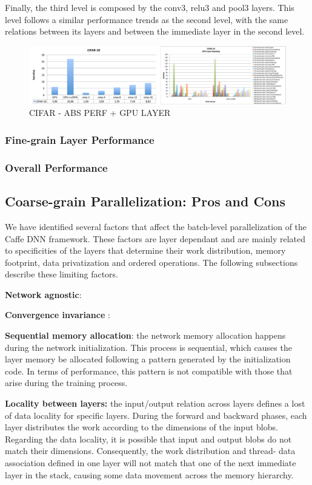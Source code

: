Finally, the third level is composed by the conv3, relu3 and pool3 
layers. This level follows a similar performance trends as the second 
level, with the same relations between its layers and between the 
immediate layer in the second level.

\begin{figure}[]
\includegraphics[width=\textwidth]{figures/cifar-abs-perf+gpu-layer.pdf}
\caption{CIFAR - ABS PERF + GPU LAYER }
\end{figure}
\subsubsection{Fine-grain Layer Performance}

\subsubsection{Overall Performance}

\subsection{Coarse-grain Parallelization: Pros and Cons}
We have identified several factors that affect the batch-level
parallelization of the Caffe DNN framework. These factors are
layer dependant and are mainly related to specificities of the
layers that determine their work distribution, memory footprint,
data privatization and ordered operations. The following subsections 
describe these limiting factors.

\textbf{Network agnostic}:

\textbf{Convergence invariance }:

\textbf{Sequential memory allocation}: the network memory allocation
happens during the network initialization. This process is sequential, 
which causes the layer memory be allocated following a
pattern generated by the initialization code. In terms of performance, 
this pattern is not compatible with those that arise during
the training process.

\textbf{Locality between layers:} the input/output relation across layers
defines a lost of data locality for specific layers. During the forward 
and backward phases, each layer distributes the work according to the 
dimensions of the input blobs. Regarding the data locality, it is 
possible that input and output blobs do not match
their dimensions. Consequently, the work distribution and thread-
data association defined in one layer will not match that one of the
next immediate layer in the stack, causing some data movement
across the memory hierarchy.

